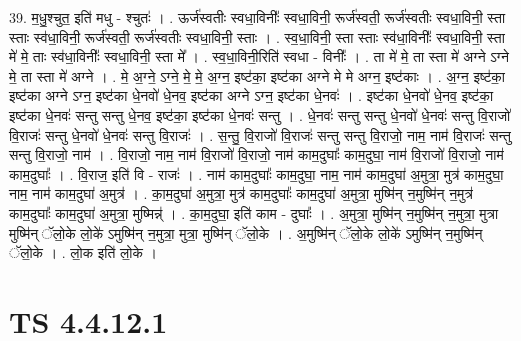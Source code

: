 \documentclass[17pt]{extarticle}
\begin{document}
39. म॒धु॒श्चुत॒ इति॑ मधु - श्चुतः॑ । . ऊर्ज॑स्वतीः स्वधा॒विनीः᳚ स्वधा॒विनी॒ रूर्ज॑स्वती॒ रूर्ज॑स्वतीः स्वधा॒विनी॒ स्ता स्ताः स्व॑धा॒विनी॒ रूर्ज॑स्वती॒ रूर्ज॑स्वतीः स्वधा॒विनी॒ स्ताः । . स्व॒धा॒विनी॒ स्ता स्ताः स्व॑धा॒विनीः᳚ स्वधा॒विनी॒ स्ता मे॑ मे॒ ताः स्व॑धा॒विनीः᳚ स्वधा॒विनी॒ स्ता मे᳚ । . स्व॒धा॒विनी॒रिति॑ स्वधा - विनीः᳚ । . ता मे॑ मे॒ ता स्ता मे॑ अग्ने ऽग्ने मे॒ ता स्ता मे॑ अग्ने । . मे॒ अ॒ग्ने॒ ऽग्ने॒ मे॒ मे॒ अ॒ग्न॒ इष्ट॑का॒ इष्ट॑का अग्ने मे मे अग्न॒ इष्ट॑काः । . अ॒ग्न॒ इष्ट॑का॒ इष्ट॑का अग्ने ऽग्न॒ इष्ट॑का धे॒नवो॑ धे॒नव॒ इष्ट॑का अग्ने ऽग्न॒ इष्ट॑का धे॒नवः॑ । . इष्ट॑का धे॒नवो॑ धे॒नव॒ इष्ट॑का॒ इष्ट॑का धे॒नवः॑ सन्तु सन्तु धे॒नव॒ इष्ट॑का॒ इष्ट॑का धे॒नवः॑ सन्तु । . धे॒नवः॑ सन्तु सन्तु धे॒नवो॑ धे॒नवः॑ सन्तु वि॒राजो॑ वि॒राजः॑ सन्तु धे॒नवो॑ धे॒नवः॑ सन्तु वि॒राजः॑ । . स॒न्तु॒ वि॒राजो॑ वि॒राजः॑ सन्तु सन्तु वि॒राजो॒ नाम॒ नाम॑ वि॒राजः॑ सन्तु सन्तु वि॒राजो॒ नाम॑ । . वि॒राजो॒ नाम॒ नाम॑ वि॒राजो॑ वि॒राजो॒ नाम॑ काम॒दुघाः᳚ काम॒दुघा॒ नाम॑ वि॒राजो॑ वि॒राजो॒ नाम॑ काम॒दुघाः᳚ । . वि॒राज॒ इति॑ वि - राजः॑ । . नाम॑ काम॒दुघाः᳚ काम॒दुघा॒ नाम॒ नाम॑ काम॒दुघा॑ अ॒मुत्रा॒ मुत्र॑ काम॒दुघा॒ नाम॒ नाम॑ काम॒दुघा॑ अ॒मुत्र॑ । . का॒म॒दुघा॑ अ॒मुत्रा॒ मुत्र॑ काम॒दुघाः᳚ काम॒दुघा॑ अ॒मुत्रा॒ मुष्मि॑न् न॒मुष्मि॑न् न॒मुत्र॑ काम॒दुघाः᳚ 
काम॒दुघा॑ अ॒मुत्रा॒ मुष्मिन्न्॑ । . का॒म॒दुघा॒ इति॑ काम - दुघाः᳚ । . अ॒मुत्रा॒ मुष्मि॑न् न॒मुष्मि॑न् न॒मुत्रा॒ मुत्रा मुष्मि॑न् ॅलो॒के लो॒के॑ ऽमुष्मि॑न् न॒मुत्रा॒ मुत्रा॒ मुष्मि॑न् ॅलो॒के । . अ॒मुष्मि॑न् ॅलो॒के लो॒के॑ ऽमुष्मि॑न् न॒मुष्मि॑न् ॅलो॒के । . लो॒क इति॑ लो॒के । \newline
\pagebreak
{}

\section{ TS 4.4.12.1 }
\end{document}
